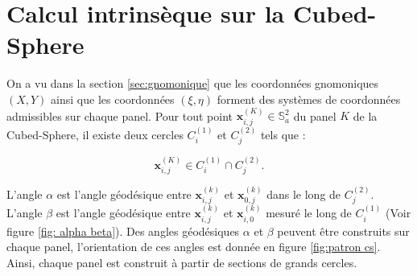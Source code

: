 
















\section{Calcul intrinsèque sur la Cubed-Sphere}

On a vu dans la section \ref{sec:gnomonique} que les coordonnées gnomoniques $(X,Y)$ ainsi que les coordonnées $(\xi,\eta)$ forment des systèmes de coordonnées admissibles sur chaque panel.  Pour tout point $\mathbf{x}_{i,j}^{(K)} \in \mathbb{S}_a^2$ du panel $K$ de la Cubed-Sphere, il existe deux cercles $C_i^{(1)}$ et $C_j^{(2)}$ tels que :

\begin{equation}
\mathbf{x}_{i,j}^{(K)} \in C_i^{(1)} \cap C_j^{(2)}.
\end{equation}

L'angle $\alpha$ est l'angle géodésique entre $\mathbf{x}_{i,j}^{(k)}$ et $\mathbf{x}_{0,j}^{(k)}$ dans le long de $C^{(2)}_j$. L'angle $\beta$ est l'angle géodésique entre $\mathbf{x}_{i,j}^{(k)}$ et $\mathbf{x}_{i,0}^{(k)}$ mesuré le long de $C^{(1)}_i$ (Voir figure \ref{fig: alpha beta}). Des angles géodésiques $\alpha$ et $\beta$ peuvent être construits sur chaque panel, l'orientation de ces angles est donnée en figure \ref{fig:patron cs}. Ainsi, chaque panel est construit à partir de sections de grands cercles.

